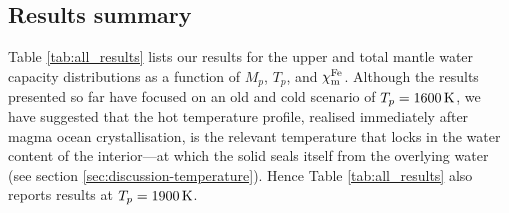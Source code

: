 \documentclass[fleqn,usenatbib]{mnras}
\newcommand{\todo}[1]{\textit{\textcolor{violet}{{#1}}}}
\newcommand{\coreeff}{$\chi^{\rm Fe}_{\rm m}$}
\begin{document}










\subsection{Results summary}

Table \ref{tab:all_results} lists our results for the upper and total mantle water capacity distributions as a function of $M_p$, $T_p$, and \coreeff. Although the results presented so far have focused on an old and cold scenario of $T_p = 1600\,{\rm K}$, we have suggested that the hot temperature profile, realised immediately after magma ocean crystallisation, is the relevant temperature that locks in the water content of the interior---at which the solid seals itself from the overlying water (see section \ref{sec:discussion-temperature}). Hence Table \ref{tab:all_results} also reports results at $T_p = 1900\,{\rm K}$.

\end{document}

